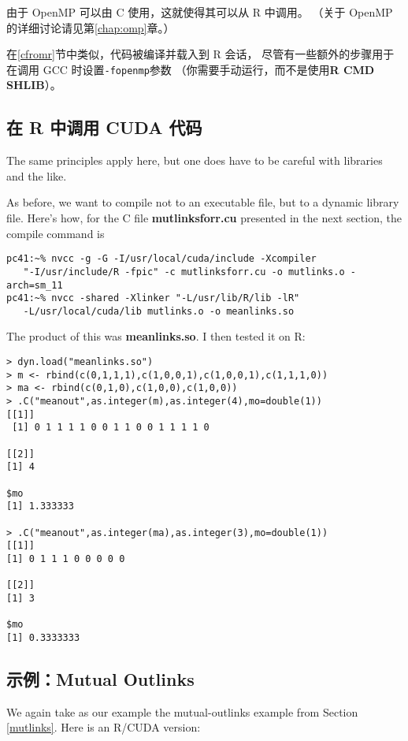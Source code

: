 由于 OpenMP 可以由 C 使用，这就使得其可以从 R 中调用。
（关于 OpenMP 的详细讨论请见第\ref{chap:omp}章。）

在\ref{cfromr}节中类似，代码被编译并载入到 R 会话，
尽管有一些额外的步骤用于在调用 GCC 时设置{\tt -fopenmp}参数
（你需要手动运行，而不是使用{\bf R CMD SHLIB}）。

\subsection{在 R 中调用 CUDA 代码}

The same principles apply here, but one does have to be careful with
libraries and the like.

As before, we want to compile not to an executable file, but to a dynamic
library file.  Here's how, for the C file {\bf mutlinksforr.cu}
presented in the next section, the compile command is

\begin{lstlisting}
pc41:~% nvcc -g -G -I/usr/local/cuda/include -Xcompiler
   "-I/usr/include/R -fpic" -c mutlinksforr.cu -o mutlinks.o -arch=sm_11
pc41:~% nvcc -shared -Xlinker "-L/usr/lib/R/lib -lR"
   -L/usr/local/cuda/lib mutlinks.o -o meanlinks.so
\end{lstlisting}

The product of this was {\bf meanlinks.so}.  I then tested it on R:

\begin{lstlisting}
> dyn.load("meanlinks.so")
> m <- rbind(c(0,1,1,1),c(1,0,0,1),c(1,0,0,1),c(1,1,1,0))
> ma <- rbind(c(0,1,0),c(1,0,0),c(1,0,0))
> .C("meanout",as.integer(m),as.integer(4),mo=double(1))
[[1]]
 [1] 0 1 1 1 1 0 0 1 1 0 0 1 1 1 1 0

[[2]]
[1] 4

$mo
[1] 1.333333

> .C("meanout",as.integer(ma),as.integer(3),mo=double(1))
[[1]]
[1] 0 1 1 1 0 0 0 0 0

[[2]]
[1] 3

$mo
[1] 0.3333333
\end{lstlisting}

\subsection{示例：Mutual Outlinks}

We again take as our example the mutual-outlinks example from Section
\ref{mutlinks}.  Here is an R/CUDA version:

